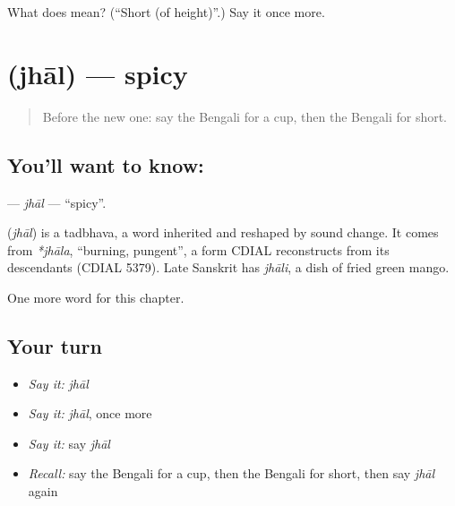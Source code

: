\begin{tcolorbox}[breakable,colback=teal!4,colframe=teal!35!black,title={Before you move on}]
What does  mean? (\textquotedblleft{}Short (of height)\textquotedblright{}.) Say it once more.
\end{tcolorbox}
\section[\texorpdfstring{\bn{ঝাল} (jhāl)}{ঝাল (jhāl)}]{ (jhāl) — spicy}

\label{lesson:BN-C134-jhal}



\begin{quote}
Before the new one: say the Bengali for a cup, then the Bengali for short.
\end{quote}

\subsection*{You'll want to know: }
\textbf{} — \emph{jhāl} — \textquotedblleft{}spicy\textquotedblright{}.

\begin{cousinweb}
\textbf{} (\emph{jhāl}) is a tadbhava, a word inherited and reshaped by sound change. It comes from \emph{*jhāla}, \textquotedblleft{}burning, pungent\textquotedblright{}, a form CDIAL reconstructs from its descendants (CDIAL 5379). Late Sanskrit has \emph{jhāli}, a dish of fried green mango.
\end{cousinweb}

\begin{grammarlens}[title={What you've built}]
One more word for this chapter.
\end{grammarlens}

\subsection*{Your turn}
\begin{itemize}
\raggedright
  \item \emph{Say it:} \emph{jhāl}
  \item \emph{Say it:} \emph{jhāl}, once more
  \item \emph{Say it:} say \emph{jhāl}
  \item \emph{Recall:} say the Bengali for a cup, then the Bengali for short, then say \emph{jhāl} again
\end{itemize}

